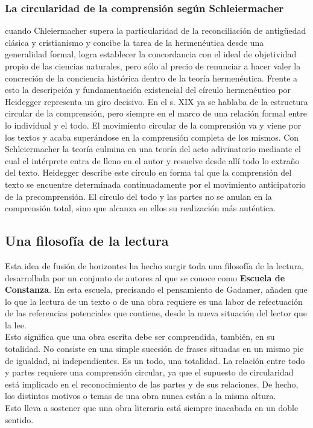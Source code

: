 \documentclass[a4paper, 11pt, twocolumn, spanish]{article}
\begin{document}
\subsubsection{La circularidad de la comprensión según Schleiermacher}
\label{sec:org1c02641}
cuando Chleiermacher supera la particularidad de la reconciliación de
antigüedad clásica y cristianismo y concibe la tarea de la
hermenéutica desde una generalidad formal, logra establecer la
concordancia con el ideal de objetividad propio de las ciencias
naturales, pero sólo al precio de renunciar a hacer valer la
concreción de la conciencia histórica dentro de la teoría
hermenéutica. Frente a esto la descripción y fundamentación
existencial del círculo hermenéutico por Heidegger representa un giro
decisivo. En el s. XIX ya se hablaba de la estructura circular de la
comprensión, pero siempre en el marco de una relación formal entre lo
individual y el todo. El movimiento circular de la comprensión va y
viene por los textos y acaba superándose en la comprensión completa de
los mismos. Con Schleiermacher la teoría culmina en una teoría del
acto adivinatorio mediante el cual el intérprete entra de lleno en el
autor y resuelve desde allí todo lo extraño del texto. Heidegger
describe este círculo en forma tal que la comprensión del texto se
encuentre determinada continuadamente por el movimiento anticipatorio
de la precomprensión. El círculo del todo y las partes no se anulan en
la comprensión total, sino que alcanza en ellos su realización más
auténtica.

\subsection{Una filosofía de la lectura}
\label{sec:org516b893}
Esta idea de fusión de horizontes ha hecho surgir toda una filosofía
de la lectura, desarrollada por un conjunto de autores al que se
conoce como \textbf{Escuela de Constanza}. En esta escuela, precisando el
pensamiento de Gadamer, añaden que lo que la lectura de un texto o de
una obra requiere es una labor de refectuación de las referencias
potenciales que contiene, desde la nueva situación del lector que la
lee.\\[0pt]
Esto significa que una obra escrita debe ser comprendida, también, en
su totalidad. No consiste en una simple sucesión de frases situadas en
un mismo pie de igualdad, ni independientes. Es un todo, una
totalidad. La relación entre todo y partes requiere una comprensión
circular, ya que el supuesto de circularidad está implicado en el
reconocimiento de las partes y de sus relaciones. De hecho, los
distintos motivos o temas de una obra nunca están a la misma altura.\\[0pt]
Esto lleva a sostener que una obra literaria está siempre inacabada en
un doble sentido.
\end{document}
